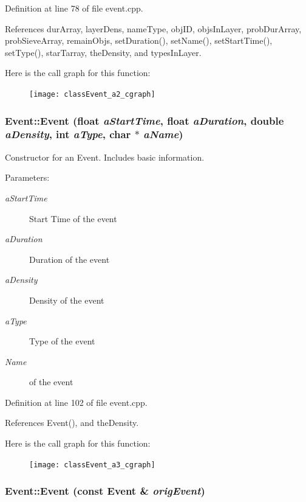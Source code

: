 Definition at line 78 of file event.cpp.

References dur\-Array, layer\-Dens, name\-Type, obj\-ID, objs\-In\-Layer, prob\-Dur\-Array, prob\-Sieve\-Array, remain\-Objs, set\-Duration(), set\-Name(), set\-Start\-Time(), set\-Type(), star\-Tarray, the\-Density, and types\-In\-Layer.

Here is the call graph for this function:\begin{figure}[H]
\begin{center}
\leavevmode
\texttt{[image: classEvent\_a2\_cgraph]}
\end{center}
\end{figure}
\subsubsection{\setlength{\rightskip}{0pt plus 5cm}Event::Event (float {\em a\-Start\-Time}, float {\em a\-Duration}, double {\em a\-Density}, int {\em a\-Type}, char $\ast$ {\em a\-Name})}\label{classEvent_a3}


Constructor for an Event. Includes basic information. \begin{Desc}
\item[Parameters:]
\begin{description}
\item[{\em a\-Start\-Time}]Start Time of the event \item[{\em a\-Duration}]Duration of the event \item[{\em a\-Density}]Density of the event \item[{\em a\-Type}]Type of the event \item[{\em Name}]of the event \end{description}
\end{Desc}


Definition at line 102 of file event.cpp.

References Event(), and the\-Density.

Here is the call graph for this function:\begin{figure}[H]
\begin{center}
\leavevmode
\texttt{[image: classEvent\_a3\_cgraph]}
\end{center}
\end{figure}
\subsubsection{\setlength{\rightskip}{0pt plus 5cm}Event::Event (const {\bf Event} \& {\em orig\-Event})}\label{classEvent_a4}


